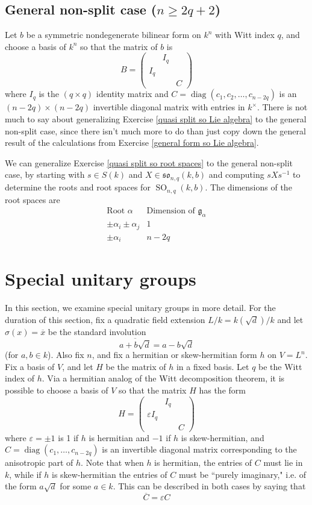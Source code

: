 \documentclass[12pt]{article}
\theoremstyle{definition}
\newcommand{\sig}{\sigma}
\newcommand{\eps}{\varepsilon}
\newcommand{\inv}{^{-1}}
\newcommand{\ov}{\overline}
\newcommand{\frakg}{\mathfrak{g}}
\newcommand{\frakso}{\mathfrak{so}}
\DeclareMathOperator{\SO}{SO}
\DeclareMathOperator{\diag}{diag}
\begin{document}
\subsection{General non-split case ($n \ge 2q + 2$)}

Let $b$ be a symmetric nondegenerate bilinear form on $k^n$ with Witt index $q$, and choose a basis of $k^n$ so that the matrix of $b$ is
\[
	B = 
	\begin{pmatrix}
		& I_q \\
		I_q \\
		&& C
	\end{pmatrix}
\]
where $I_q$ is the $(q \times q)$ identity matrix and $C = \diag(c_1, c_2, \ldots, c_{n-2q})$ is an $(n-2q) \times (n-2q)$ invertible diagonal matrix with entries in $k^\times$. There is not much to say about generalizing Exercise \ref{quasi split so Lie algebra} to the general non-split case, since there isn't much more to do than just copy down the general result of the calculations from Exercise \ref{general form so Lie algebra}.

We can generalize Exercise \ref{quasi split so root spaces} to the general non-split case, by starting with $s \in S(k)$ and $X \in \frakso_{n,q}(k,b)$ and computing $sXs \inv$ to determine the roots and root spaces for $\SO_{n,q}(k,b)$. The dimensions of the root spaces are
\[
	\begin{array}{c|c}
		\text{Root } \alpha & \text{Dimension of } \frakg_\alpha \\
		\hline
		\pm \alpha_i \pm \alpha_j & 1 \\
		\pm \alpha_i & n-2q
	\end{array}
\]

\newpage
\section{Special unitary groups}

In this section, we examine special unitary groups in more detail. For the duration of this section, fix a quadratic field extension $L/k = k(\sqrt{d})/k$ and let $\sig(x) = \ov x$ be the standard involution
\[
	\ov{a+b \sqrt{d}} = a-b \sqrt{d}
\]
(for $a,b \in k$). Also fix $n$, and fix a hermitian or skew-hermitian form $h$ on $V = L^{n}$. Fix a basis of $V$, and let $H$ be the matrix of $h$ in a fixed basis. Let $q$ be the Witt index of $h$. Via a hermitian analog of the Witt decomposition theorem, it is possible to choose a basis of $V$ so that the matrix $H$ has the form
\[
	H =
	\begin{pmatrix}
		& I_q \\
		\eps I_q \\
		&& C
	\end{pmatrix}
\]
where $\eps = \pm 1$ is 1 if $h$ is hermitian and $-1$ if $h$ is skew-hermitian, and $C = \diag(c_1, \ldots, c_{n-2q})$ is an invertible diagonal matrix corresponding to the anisotropic part of $h$. Note that when $h$ is hermitian, the entries of $C$ must lie in $k$, while if $h$ is skew-hermitian the entries of $C$ must be ``purely imaginary," i.e. of the form $a \sqrt{d}$ for some $a \in k$. This can be described in both cases by saying that
\[
	\ov C = \eps C
\]
\end{document}
